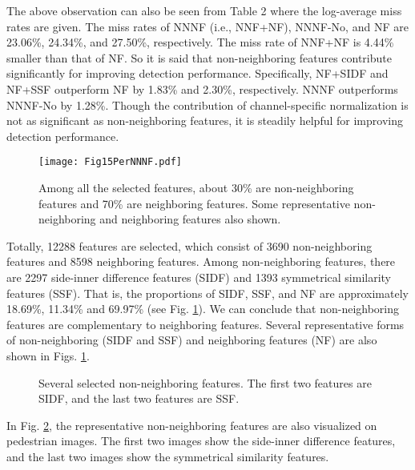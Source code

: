 \documentclass[10pt,twocolumn,letterpaper]{article}
\begin{document}
The above observation can also be seen from Table 2 where the log-average 
miss rates are given. The miss rates of NNNF 
(i.e., NNF+NF), NNNF-No, and NF are 23.06{\%}, 24.34{\%}, and 27.50{\%}, 
respectively. The miss rate of NNF+NF is 4.44{\%} smaller than 
that of NF. So it is said that non-neighboring features contribute 
significantly for improving detection performance. Specifically, NF+SIDF and 
NF+SSF outperform NF by 1.83{\%} and 2.30{\%}, respectively. NNNF 
outperforms NNNF-No by 1.28{\%}. Though the contribution of channel-specific 
normalization is not as significant as non-neighboring features, it is 
steadily helpful for improving detection performance.

\begin{figure}[!t]
\centering
\texttt{[image: Fig15PerNNNF.pdf]}
\caption{ Among all the selected features, about 30\% are non-neighboring features and 70\% are neighboring features. Some representative non-neighboring and neighboring features also shown.}
\label{FigPerNNNF}
\end{figure}

Totally, 12288 features are selected, which consist of 3690 
non-neighboring features and 8598 neighboring features. Among 
non-neighboring features, there are 2297 side-inner difference features 
(SIDF) and 1393 symmetrical similarity features (SSF). That is, the 
proportions of SIDF, SSF, and NF are approximately 18.69{\%}, 11.34{\%} and 
69.97{\%} (see Fig. \ref{FigPerNNNF}). We can conclude that non-neighboring features are 
complementary to neighboring features. Several representative forms of 
non-neighboring (SIDF and SSF) and neighboring features (NF) are also shown 
in Figs. \ref{FigPerNNNF}. 

\begin{figure}[!t]
\centering
{}
\hfil
{}
\hfil
{}
\hfil
{}
\caption{Several selected non-neighboring features. The first two features are SIDF, and the last two features are SSF.}
\label{FigSIDFSSF}
\end{figure}


In Fig. \ref{FigSIDFSSF}, the representative non-neighboring features are also visualized 
on pedestrian images. The first two images show the side-inner difference 
features, and the last two images show the symmetrical similarity features.
\end{document}
